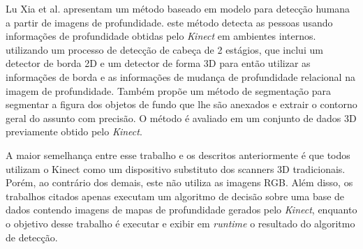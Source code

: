 Lu Xia et al. \cite{xia2011human} apresentam um método baseado em modelo para detecção humana a partir de imagens de profundidade. este método detecta as pessoas usando informações de profundidade obtidas pelo \textit{Kinect} em ambientes internos. utilizando um processo de detecção de cabeça de 2 estágios, que inclui um detector de borda 2D e um detector de forma 3D para então utilizar as informações de borda e as informações de mudança de profundidade relacional na imagem de profundidade. Também propõe um método de segmentação para segmentar a figura dos objetos de fundo que lhe são anexados e extrair o contorno geral do assunto com precisão. O método é avaliado em um conjunto de dados 3D previamente obtido pelo \textit{Kinect}.



A maior semelhança entre esse trabalho e os descritos anteriormente é que todos utilizam o Kinect como um dispositivo substituto dos scanners 3D tradicionais. Porém, ao contrário dos demais, este não utiliza as imagens RGB. Além disso, os trabalhos citados apenas executam um algoritmo de decisão sobre uma base de dados contendo imagens de mapas de profundidade gerados pelo  \textit{Kinect}, enquanto o objetivo desse trabalho é executar e exibir em  \textit{runtime} o resultado do algoritmo de detecção.
